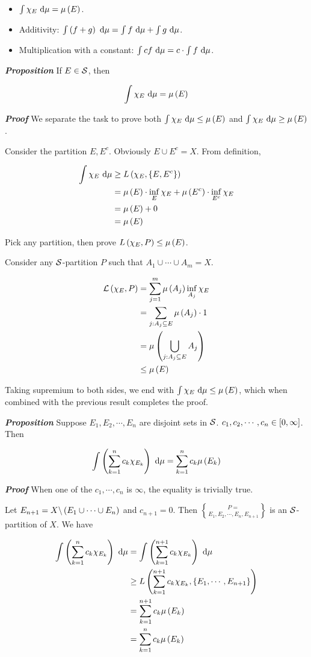\documentclass[
]{article}
\begin{document}
\begin{itemize}
\item
  \(\int \chi_E\d \mu = \lm{E}\).
\item
  Additivity: \(\int \pr{f+g}\d \mu = \int f\d \mu+\int g\d \mu\).
\item
  Multiplication with a constant:
  \(\int cf\d \mu = c\cdot \int f\d \mu\).
\end{itemize}

\emph{\textbf{Proposition}} If \(E\in \S\), then

\[\int\chi_E\d \mu = \lm{E}\]

\emph{\textbf{Proof}} We separate the task to prove both
\(\int\chi_E\d \mu \le \lm{E}\) and \(\int\chi_E\d \mu \ge \lm{E}\).

Consider the partition \(E,E^c\). Obviously \(E\cup E^c = X\). From
definition,

\[\ba
\int\chi_E\dm & \ge L\pr{\chi_E,\brace{E,E^c}} \\
& = \lm{E}\cdot \inf_{E}\chi_E+\lm{E^c}\cdot \inf_{E^c}\chi_{E} \\
& = \lm{E}+0 \\
& = \lm{E}
\ea\]

Pick any partition, then prove \(L\pr{\chi_E,P}\le \lm{E}\).

Consider any \(\S\)-partition \(P\) such that
\(A_1\cup\cdots \cup A_m = X\).

\[\ba
\L\pr{\chi_E,P} & = \sum_{j = 1}^m\lm{A_j}\inf_{A_j}\chi_E\\
& = \sum_{j:A_j\se E}\lm{A_j}\cdot 1\\
& = \lm{\bigcup_{j:A_j\se E}A_j}\\
& \le \lm{E}
\ea\]

Taking supremium to both sides, we end with
\(\int \chi_E\dm \le \lm{E}\), which when combined with the previous
result completes the proof.

\emph{\textbf{Proposition}} Suppose \(E_1,E_2,\cdots ,E_n\) are disjoint
sets in \(\S\). \(c_1,c_2,\cdots,c_n\in \br{0,\infty}\). Then

\[\int \pr{\sum_{k = 1}^nc_k\chi_{E_k}}\dm = \sum_{k = 1}^nc_k\lm{E_k}\]

\emph{\textbf{Proof}} When one of the \(c_1,\cdots,c_n\) is \(\infty\),
the equality is trivially true.

Let \(E_{n+1} = X\c \pr{E_1\cup\cdots \cup E_n}\) and \(c_{n+1} = 0\).
Then \(P = \brace{E_1,E_2,\cdots ,E_n,E_{n+1}}\) is an \(\S\)-partition
of \(X\). We have

\[\ba
\int \pr{\sum_{k = 1}^nc_k\chi_{E_k}}\dm & = \int \pr{\sum_{k = 1}^{n+1}c_k\chi_{E_k}}\dm \\
& \ge L\pr{\sum_{k = 1}^{n+1}c_k\chi_{E_k},\brace{E_1,\cdots,E_{n+1}}}\\
& = \sum_{k = 1}^{n+1}c_k\lm{E_k}\\
& = \sum_{k = 1}^{n}c_k\lm{E_k}
\ea\]
\end{document}
